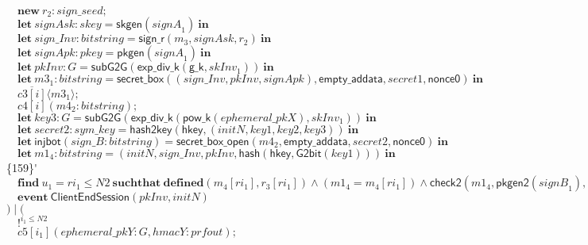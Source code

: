 \documentclass{article}
\newcommand{\cinput}[2]{{#1}({#2})}
\newcommand{\coutput}[2]{\overline{#1}\langle{#2}\rangle}
\newcommand{\kw}[1]{\mathbf{#1}}
\newcommand{\kwf}[1]{\mathsf{#1}}
\newcommand{\var}[1]{\mathit{#1}}
\newcommand{\kwt}[1]{\mathit{#1}}
\newcommand{\kwp}[1]{\mathit{#1}}
\newcommand{\kwc}[1]{\mathit{#1}}
\begin{document}
\begin{tabbing}
\>$\quad \kw{new}\ \var{r}_{2}: \kwt{sign{\_}seed};$\\
\>$\quad \kw{let}\ \var{signAsk}: \kwt{skey} = \kwf{skgen}(\var{signA}_{1})\ \kw{in}$\\
\>$\quad \kw{let}\ \var{sign{\_}Inv}: \kwt{bitstring} = \kwf{sign{\_}r}(\var{m}_{3}, \var{signAsk}, \var{r}_{2})\ \kw{in}$\\
\>$\quad \kw{let}\ \var{signApk}: \kwt{pkey} = \kwf{pkgen}(\var{signA}_{1})\ \kw{in}$\\
\>$\quad \kw{let}\ \var{pkInv}: \kwt{G} = \kwf{subG2G}(\kwf{exp{\_}div{\_}k}(\kwf{g{\_}k}, \var{skInv}_{1}))\ \kw{in}$\\
\>$\quad \kw{let}\ \var{m3}_{1}: \kwt{bitstring} = \kwf{secret{\_}box}(\kwf{}(\var{sign{\_}Inv}, \var{pkInv}, \var{signApk}), \kwf{empty{\_}addata}, \var{secret1}, \kwf{nonce0})\ \kw{in}$\\
\>$\quad \coutput{\kwc{c3}[\var{i}]}{\var{m3}_{1}};$\\
\>$\quad \cinput{\kwc{c4}[\var{i}]}{\var{m4}_{2}: \kwt{bitstring}};$\\
\>$\quad \kw{let}\ \var{key3}: \kwt{G} = \kwf{subG2G}(\kwf{exp{\_}div{\_}k}(\kwf{pow{\_}k}(\var{ephemeral{\_}pkX}), \var{skInv}_{1}))\ \kw{in}$\\
\>$\quad \kw{let}\ \var{secret2}: \kwt{sym{\_}key} = \kwf{hash2key}(\kwf{hkey}, \kwf{}(\var{initN}, \var{key1}, \var{key2}, \var{key3}))\ \kw{in}$\\
\>$\quad \kw{let}\ \kwf{injbot}(\var{sign{\_}B}: \kwt{bitstring}) = \kwf{secret{\_}box{\_}open}(\var{m4}_{2}, \kwf{empty{\_}addata}, \var{secret2}, \kwf{nonce0})\ \kw{in}$\\
\>$\quad \kw{let}\ \var{m1}_{4}: \kwt{bitstring} = \kwf{}(\var{initN}, \var{sign{\_}Inv}, \var{pkInv}, \kwf{hash}(\kwf{hkey}, \kwf{G2bit}(\var{key1})))\ \kw{in}$\\
\>\{159\}\'$\quad \kw{find}\ \var{u}_{1} = \var{ri}_{1} \leq \kwp{N2}\ \kw{suchthat}\ \kw{defined}(\var{m}_{4}[\var{ri}_{1}], \var{r}_{3}[\var{ri}_{1}])\wedge (\var{m1}_{4}  =  \var{m}_{4}[\var{ri}_{1}]) \wedge  \kwf{check2}(\var{m1}_{4}, \kwf{pkgen2}(\var{signB}_{1}), \var{sign{\_}B})\ \kw{then}$\\
\>$\quad \kw{event}\ \kwf{ClientEndSession}(\var{pkInv}, \var{initN})$\\
\>$) \mid ($\\
\>$\quad !^{\var{i}_{1} \leq \kwp{N2}}$\\
\>$\quad \cinput{\kwc{c5}[\var{i}_{1}]}{\var{ephemeral{\_}pkY}: \kwt{G}, \var{hmacY}: \kwt{prfout}};$\\

\end{tabbing}
\end{document}
